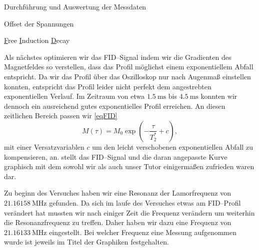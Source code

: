 \documentclass[pdftex, a4paper,11pt, twoside, ngerman]{report}
\begin{document}
\begin{chapter}{Durchführung und Auswertung der Messdaten}
\begin{section}{Offset der Spannungen}
    \end{section}
    
    
    
    \begin{section}{
        \underline{F}ree \underline{I}nduction \underline{D}ecay}
      \label{chpFID}
      
      Als nächstes optimieren wir das FID--Signal indem wir die Gradienten
      des Magnetfeldes so verstellen, dass das Profil möglichst einem
      exponentiellem Abfall entspricht.
      Da wir das Profil über das Oszilloskop nur nach Augenmaß einstellen
      konnten, entspricht das Profil leider nicht perfekt dem angestrebten
      exponentiellen Verlauf.
      Im Zeitraum von etwa $\SI{1.5}{\milli\second}$ bis
      $\SI{4.5}{\milli\second}$ konnten wir dennoch ein ausreichend
      gutes exponentielles Profil erreichen.
      An diesen zeitlichen Bereich passen wir \cref{eqFID}
      \begin{equation}
        \label{eqFID}
        M(\tau)=M_{0}\exp{\left(-\frac{\tau}{T_{2}^{*}}+c\right)},
      \end{equation}
      mit einer Versatzvariablen $c$ um den leicht verschobenen exponentiellen
      Abfall zu kompensieren, an.
       stellt das FID--Signal und die daran angepasste Kurve
      graphisch mit dem sowohl wir als auch unser Tutor einigermaßen zufrieden
      waren dar.
      
      Zu beginn des Versuches haben wir eine Resonanz der Lamorfrequenz von
      $\SI{21.16158}{\mega\hertz}$ gefunden.
      Da sich im laufe des Versuches etwas am FID--Profil verändert hat
      mussten wir nach einiger Zeit die Frequenz verändern um weiterhin die
      Resonanzfrequenz zu treffen.
      Daher haben wir dazu eine Frequenz von $\SI{21.16133}{\mega\hertz}$
      eingestellt.
      Bei welcher Frequenz eine Messung aufgenommen wurde ist jeweils im Titel
      der Graphiken festgehalten.
      

\end{section}
\end{chapter}
\end{document}
